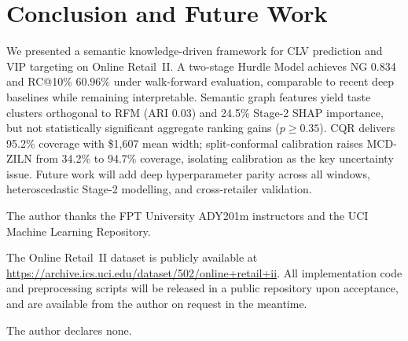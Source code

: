 \documentclass[pdflatex,sn-mathphys-num]{sn-jnl}
\theoremstyle{thmstyleone}
\theoremstyle{thmstyletwo}
\theoremstyle{thmstylethree}
\begin{document}
\section{Conclusion and Future Work}\label{sec:conclusion}

We presented a semantic knowledge-driven framework for CLV prediction
and VIP targeting on Online Retail~II. A two-stage Hurdle Model achieves
NG 0.834 and RC@10\% 60.96\% under walk-forward evaluation, comparable
to recent deep baselines while remaining interpretable. Semantic graph
features yield taste clusters orthogonal to RFM (ARI 0.03) and 24.5\%
Stage-2 SHAP importance, but not statistically significant aggregate
ranking gains ($p\geq 0.35$). CQR delivers 95.2\% coverage with
\$1{,}607 mean width; split-conformal calibration raises MCD-ZILN from
34.2\% to 94.7\% coverage, isolating calibration as the key uncertainty
issue. Future work will add deep hyperparameter parity across all windows,
heteroscedastic Stage-2 modelling, and cross-retailer validation.


 The author thanks the FPT University ADY201m
instructors and the UCI Machine Learning Repository.

 The Online Retail~II dataset is
publicly available at
\url{https://archive.ics.uci.edu/dataset/502/online+retail+ii}.
All implementation code and preprocessing scripts will be released
in a public repository upon acceptance, and are available from the
author on request in the meantime.

 The author declares none.

\end{document}
